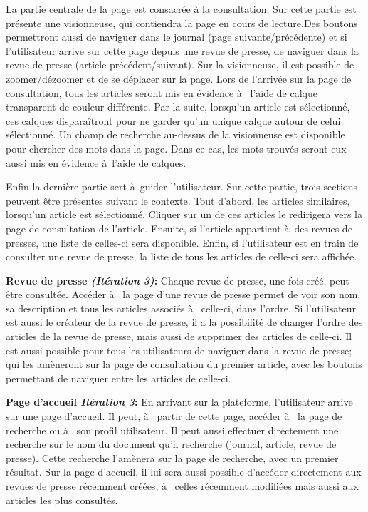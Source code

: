 	La partie centrale de la page est consacrée à la consultation. Sur cette partie est présente une visionneuse, qui contiendra la page en cours de lecture.Des boutons permettront aussi de naviguer dans le journal (page suivante/précédente) et si l'utilisateur arrive sur cette page depuis une revue de presse, de naviguer dans la revue de presse (article précédent/suivant). Sur la visionneuse, il est possible de zoomer/dézoomer et de se déplacer sur la page. Lors de l'arrivée sur la page de consultation, tous les articles seront mis en évidence à  l'aide de calque transparent de couleur différente. Par la suite, lorsqu'un article est sélectionné, ces calques disparaîtront pour ne garder qu'un unique calque autour de celui sélectionné. Un champ de recherche au-dessus de la visionneuse est disponible pour chercher des mots dans la page. Dans ce cas, les mots trouvés seront eux aussi mis en évidence à l'aide de calques. 
	
	Enfin la dernière partie sert à guider l'utilisateur. Sur cette partie, trois sections peuvent être présentes suivant le contexte. Tout d'abord, les articles similaires, lorsqu'un article est sélectionné. Cliquer sur un de ces articles le redirigera vers la page de consultation de l'article. Ensuite, si l'article appartient à des revues de presses, une liste de celles-ci sera disponible. Enfin, si l'utilisateur est en train de consulter une revue de presse, la liste de tous les articles de celle-ci sera affichée.


	\textbf{Revue de presse \textit{(Itération 3)}:} Chaque revue de presse, une fois créé, peut-être consultée. Accéder à  la page d'une revue de presse permet de voir son nom, sa description et tous les articles associés à  celle-ci, dans l'ordre. Si l'utilisateur est aussi le créateur de la revue de presse, il a la possibilité de changer l'ordre des articles de la revue de presse, mais aussi de supprimer des articles de celle-ci. Il est aussi possible pour tous les utilisateurs de naviguer dans la revue de presse; qui les amèneront sur la page de consultation du premier article, avec les boutons permettant de naviguer entre les articles de celle-ci.

	\textbf{Page d'accueil \textit{Itération 3}:} En arrivant sur la plateforme, l'utilisateur arrive sur une page d'accueil. Il peut, à  partir de cette page, accéder à  la page de recherche ou à  son profil utilisateur. Il peut aussi effectuer directement une recherche sur le nom du document qu'il recherche (journal, article, revue de presse). Cette recherche l'amènera sur la page de recherche, avec un premier résultat. Sur la page d'accueil, il lui sera aussi possible d'accéder directement aux revues de presse récemment créées, à  celles récemment modifiées mais aussi aux articles les plus consultés.

